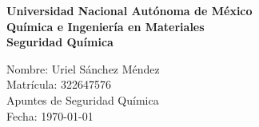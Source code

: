 \documentclass[12pt]{article}
\begin{document}
\begin{titlepage}
\thispagestyle{empty}
\begin{center}
\vspace*{2cm}
\fontsize{14}{30}\selectfont\textbf{Universidad Nacional Autónoma de México} \\
\vspace{1cm}
\fontsize{14}{30}\selectfont\textbf{Química e Ingeniería en Materiales} \\
\vspace{1cm}
\fontsize{14}{30}\selectfont\textbf{Seguridad Química} \\
\end{center}
\vspace{2cm}
\begin{flushright}
    \fontsize{14}{30}\selectfont
        \hspace{2cm} Nombre: Uriel Sánchez Méndez \\
        \hspace{2cm} Matrícula: 322647576 \\
        \hspace{2cm} Apuntes de Seguridad Química \\
        \hspace{2cm} Fecha: \today \\
\end{flushright}
\end{titlepage}

\tableofcontents
\thispagestyle{empty}
\newpage



\end{document}
